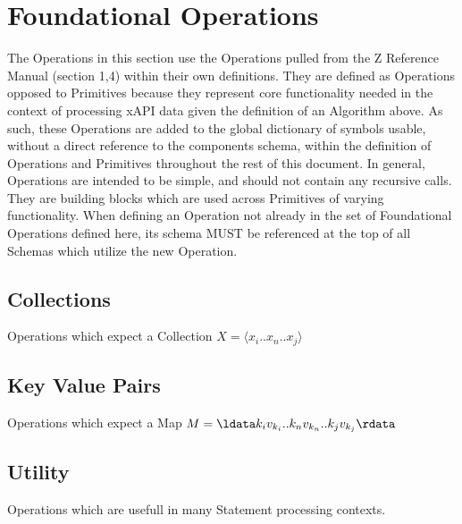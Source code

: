 \documentclass{article}
\begin{document}




\section{Foundational Operations}
The Operations in this section use the Operations pulled from the Z Reference Manual (section 1,4) within their own definitions.
They are defined as Operations opposed to Primitives because they represent core functionality needed in the context
of processing xAPI data given the definition of an Algorithm above. As such, these Operations are added to the global
dictionary of symbols usable, without a direct reference to the components schema, within the definition of
Operations and Primitives throughout the rest of this document. In general, Operations are intended to be
simple, and should not contain any recursive calls. They are building blocks which are used across Primitives
of varying functionality. When defining an Operation not already in the set of Foundational Operations defined here, its schema
MUST be referenced at the top of all Schemas which utilize the new Operation.

\subsection{Collections}
Operations which expect a Collection $X = \langle x_{i}..x_{n}..x_{j} \rangle$






\subsection{Key Value Pairs}
Operations which expect a Map $M = \ldata k_{i}v_{k_{i}}..k_{n}v_{k_{n}}..k_{j}v_{k_{j}} \rdata$






\subsection{Utility}
Operations which are usefull in many Statement processing contexts.




\end{document}
